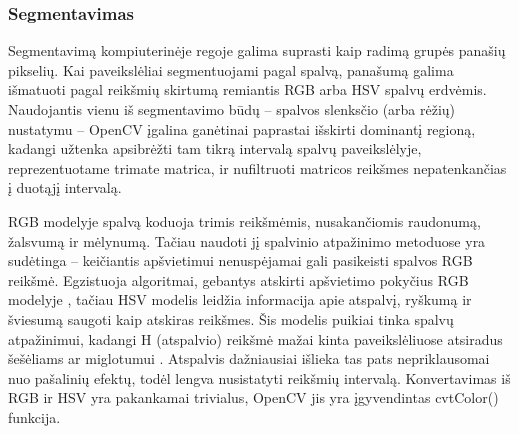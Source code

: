 \documentclass{VUMIFPSbakalaurinis}
\begin{document}
\subsubsection{Segmentavimas}
Segmentavimą kompiuterinėje regoje galima suprasti kaip radimą grupės panašių pikselių. Kai paveikslėliai segmentuojami pagal spalvą, panašumą galima išmatuoti pagal reikšmių skirtumą remiantis RGB arba HSV spalvų erdvėmis. Naudojantis vienu iš segmentavimo būdų – spalvos slenksčio (arba rėžių) nustatymu – OpenCV įgalina ganėtinai paprastai išskirti dominantį regioną, kadangi užtenka apsibrėžti tam tikrą intervalą spalvų paveikslėlyje, reprezentuotame trimate matrica, ir nufiltruoti matricos reikšmes nepatenkančias į duotąjį intervalą. 

RGB modelyje spalvą koduoja trimis reikšmėmis, nusakančiomis raudonumą, žalsvumą ir mėlynumą. Tačiau naudoti jį spalvinio atpažinimo metoduose yra sudėtinga – keičiantis apšvietimui nenuspėjamai gali pasikeisti spalvos RGB reikšmė. Egzistuoja algoritmai, gebantys atskirti apšvietimo pokyčius RGB modelyje \cite{1220504}, tačiau HSV modelis leidžia informacija apie atspalvį, ryškumą ir šviesumą saugoti kaip atskiras reikšmes. Šis modelis puikiai tinka spalvų atpažinimui, kadangi H (atspalvio) reikšmė mažai kinta paveikslėliuose atsiradus šešėliams \cite{1039893} ar miglotumui \cite{7457892}. Atspalvis dažniausiai išlieka tas pats nepriklausomai nuo pašalinių efektų, todėl lengva nusistatyti reikšmių intervalą. Konvertavimas iš RGB ir HSV yra pakankamai trivialus, OpenCV jis yra įgyvendintas cvtColor() funkcija. 
\end{document}
